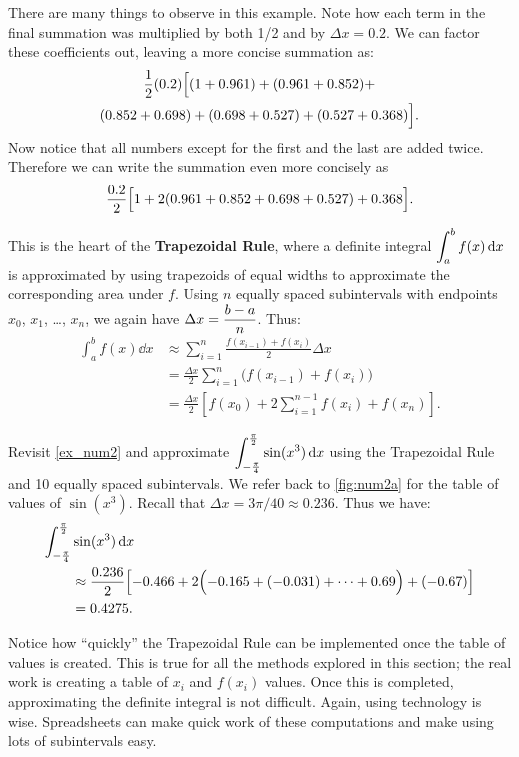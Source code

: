 There are many things to observe in this example. Note how each term in the final summation was multiplied by both 1/2 and by $\Delta x = 0.2$. We can factor these coefficients out, leaving a more concise summation as:
\begin{multline*}
\frac12(0.2)\Bigl[(1+0.961) + (0.961+0.852) +\\
 (0.852+0.698) + ( 0.698+ 0.527) +(0.527 + 0.368)\Bigr].
\end{multline*}
Now notice that all numbers except for the first and the last are added twice. Therefore we can write the summation even more concisely as
\[\frac{0.2}{2}\Bigl[1 + 2(0.961+0.852+0.698+0.527) + 0.368\Bigr].\]

This is the heart of the \textbf{Trapezoidal Rule}, where a definite integral $\displaystyle \int_a^b f(x)\operatorname{d}\! x$ is approximated by using trapezoids of equal widths to approximate the corresponding area under $f$. Using $n$ equally spaced subintervals with endpoints $x_0$, $x_1$, \dots, $x_n$, we again have $\displaystyle \Delta x = \frac{b-a}n$. Thus:
\begin{align*}
	\int_a^b f(x)\dd x
	& \approx \sum_{i=1}^n \frac{f(x_{i-1})+f(x_i)}2\Delta x \\
	& = \frac{\Delta x}2 \sum_{i=1}^n \bigl(f(x_{i-1})+f(x_i)\bigr)\\
	& = \frac{\Delta x}2\left[f(x_0)+ 2\sum_{i=1}^{n-1} f(x_i) + f(x_n)\right].
\end{align*}

\begin{example}\label{ex_num4}%
Revisit \autoref{ex_num2} and approximate $\displaystyle\int_{-\frac{\pi}{4}}^{\frac{\pi}{2}} \sin (x^3)\operatorname{d}\! x$ using the Trapezoidal Rule and 10 equally spaced subintervals.
\solution
We refer back to \autoref{fig:num2a} for the table of values of $\sin(x^3)$. Recall that $\Delta x = 3\pi/40 \approx 0.236$. Thus we have:\small
\begin{align*}
	\int_{-\frac{\pi}4}^{\frac{\pi}2} & \sin (x^3)\dd x \\
	&\approx \frac{0.236}{2}\Bigl[-0.466 + 2\Bigl(-0.165+(-0.031)+\dotsb+%
0.69\Bigr)+(-0.67)\Bigr]\\
	&= 0.4275.
\end{align*}
\end{example}

Notice how ``quickly'' the Trapezoidal Rule can be implemented once the table of values is created. This is true for all the methods explored in this section; the real work is creating a table of $x_i$ and $f(x_i)$ values. Once this is completed, approximating the definite integral is not difficult. Again, using technology is wise. Spreadsheets can make quick work of these computations and make using lots of subintervals easy. 

